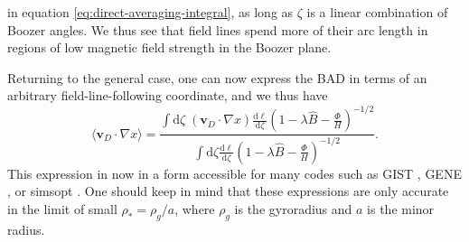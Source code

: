 in equation \eqref{eq:direct-averaging-integral}, as long as $\zeta$ is a linear combination of Boozer angles. We thus see that field lines spend more of their arc length in regions of low magnetic field strength in the Boozer plane. \par
Returning to the general case, one can now express the BAD in terms of an arbitrary field-line-following coordinate, and we thus have
\begin{equation}
    \langle \mathbf{v}_D \cdot \nabla x  \rangle = \frac{\int \mathrm{d} \zeta \; (\mathbf{v}_D \cdot \nabla x) \frac{\mathrm{d} \ell}{\mathrm{d} \zeta} \left(1 - \lambda \hat{B} - \frac{\Phi}{H} \right)^{-1/2}  }{\int \mathrm{d} \zeta  \frac{\mathrm{d} \ell}{\mathrm{d} \zeta} \left(1 - \lambda \hat{B} - \frac{\Phi}{H} \right)^{-1/2} }.
    \label{eq:direct-ave-general}
\end{equation}
This expression in now in a form accessible for many codes such as GIST \cite{xanthopoulos2009geometry}, GENE \cite{jenko2001critical}, or simsopt \cite{landreman2021simsopt}. One should keep in mind that these expressions are only accurate in the limit of small $\rho_*=\rho_g/a$, where $\rho_g$ is the gyroradius and $a$ is the minor radius.

